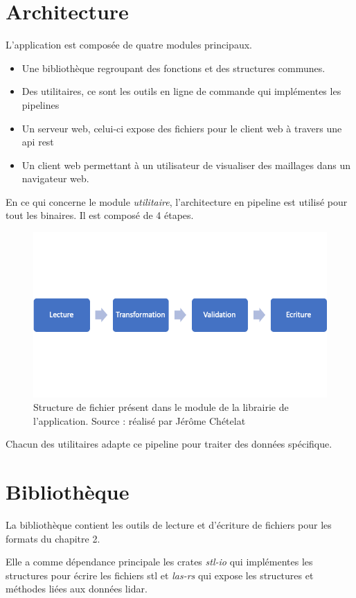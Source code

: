 \section{Architecture}

L'application est composée de quatre modules principaux.

\begin{itemize}
	\item Une bibliothèque regroupant des fonctions et des structures communes.
	\item Des utilitaires, ce sont les outils en ligne de commande qui
		implémentes les pipelines 
	\item Un serveur web, celui-ci expose des fichiers pour le client web à
		travers une api \gls{rest}
	\item Un client web permettant à un utilisateur de visualiser des maillages
		dans un navigateur web.
\end{itemize}

En ce qui concerne le module \textit{utilitaire}, l'architecture en pipeline est
utilisé pour tout les binaires. Il est composé de 4 étapes. 

\begin{figure}[htbp!]
    \centering
    \includegraphics[width=0.5\linewidth]{figures/pipeline_process.png}
    \caption{Structure de fichier présent dans le module de la librairie de l'application. Source : réalisé par Jérôme Chételat}
    \label{fig:pipeline_process}
\end{figure}

Chacun des utilitaires adapte ce pipeline pour traiter des données spécifique.

\section{Bibliothèque}

La bibliothèque contient les outils de lecture et d'écriture de fichiers pour les formats du chapitre 2.

Elle a comme dépendance principale les crates \textit{stl-io}
qui implémentes les structures pour écrire les fichiers \gls{stl} 
et \textit{las-rs} qui expose les structures et méthodes liées aux données lidar.

